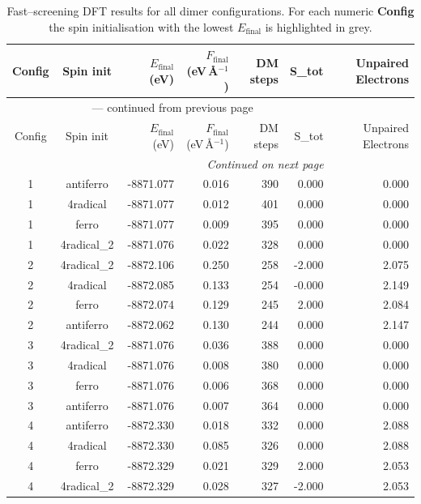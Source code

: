 
\begin{longtable}{@{}ccrrrrr@{}}
\caption{Fast–screening DFT results for all dimer configurations.
         For each numeric \textbf{Config} the spin initialisation with the
         lowest $E_{\mathrm{final}}$ is highlighted in grey.}\label{tab:dimer_full}\\
\toprule
Config & Spin init & $E_{\mathrm{final}}$ (eV) &
$F_{\mathrm{final}}$ (eV\,\AA$^{-1}$) & DM steps & S_{tot} & Unpaired Electrons\\
\midrule
\endfirsthead
\multicolumn{6}{c}{{\tablename}~\thetable{} — continued from previous page}\\
\toprule
Config & Spin init & $E_{\mathrm{final}}$ (eV) &
$F_{\mathrm{final}}$ (eV\,\AA$^{-1}$) & DM steps & S_{tot} & Unpaired Electrons\\
\midrule
\endhead
\midrule
\multicolumn{6}{r}{\emph{Continued on next page}}\\
\endfoot
\bottomrule
\endlastfoot
\rowcolor{gray!20} 1 & antiferro & -8871.077 & 0.016 & 390 & 0.000 & 0.000 \\
1 & 4radical & -8871.077 & 0.012 & 401 & 0.000 & 0.000 \\
1 & ferro & -8871.077 & 0.009 & 395 & 0.000 & 0.000 \\
1 & 4radical\_2 & -8871.076 & 0.022 & 328 & 0.000 & 0.000 \\
\rowcolor{gray!20} 2 & 4radical\_2 & -8872.106 & 0.250 & 258 & -2.000 & 2.075 \\
2 & 4radical & -8872.085 & 0.133 & 254 & -0.000 & 2.149 \\
2 & ferro & -8872.074 & 0.129 & 245 & 2.000 & 2.084 \\
2 & antiferro & -8872.062 & 0.130 & 244 & 0.000 & 2.147 \\
\rowcolor{gray!20} 3 & 4radical\_2 & -8871.076 & 0.036 & 388 & 0.000 & 0.000 \\
3 & 4radical & -8871.076 & 0.008 & 380 & 0.000 & 0.000 \\
3 & ferro & -8871.076 & 0.006 & 368 & 0.000 & 0.000 \\
3 & antiferro & -8871.076 & 0.007 & 364 & 0.000 & 0.000 \\
\rowcolor{gray!20} 4 & antiferro & -8872.330 & 0.018 & 332 & 0.000 & 2.088 \\
4 & 4radical & -8872.330 & 0.085 & 326 & 0.000 & 2.088 \\
4 & ferro & -8872.329 & 0.021 & 329 & 2.000 & 2.053 \\
4 & 4radical\_2 & -8872.329 & 0.028 & 327 & -2.000 & 2.053 \\
\end{longtable}